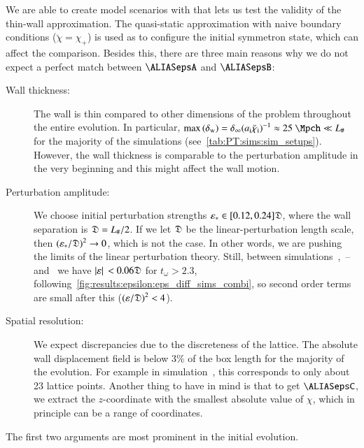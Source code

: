 





We are able to create model scenarios with \asgrd{} that lets us test the validity of the thin-wall approximation. The quasi-static approximation with naive boundary conditions ($\breve{\chi}=\chi_+$) is used as to configure the initial symmetron state, which can affect the comparison. %
Besides this, there are three main reasons why we do not expect a perfect match between $\epsA$ and $\epsB$:
\begin{description}
    \item[Wall thickness:] The wall is thin compared to other dimensions of the problem throughout the entire evolution. In particular, $\max{(\delta\ped{w})}=\delta_\infty  {(a\ped{i}\breve{\chi}\ped{i})}^{-1} \approx 25~\Mpch \ll L_\#$ for the majority of the simulations (see~\cref{tab:PT:sims:sim_setups}). However, the wall thickness is comparable to the perturbation amplitude in the very beginning and this might affect the wall motion.
    \item[Perturbation amplitude:] We choose initial perturbation strengths $\varepsilon_\ast\in[0.12, 0.24]\mathfrak{D}$, where the wall separation is $\mathfrak{D}=L_\#/2$. If we let $\mathfrak{D}$ be the linear-perturbation length scale, then ${(\varepsilon_\ast/\mathfrak{D})}^2 \to 0$, which is not the case. 
    In other words, we are pushing the limits of the linear perturbation theory. %
    Still, between simulations~,~-- and~ we have $\abs*{\varepsilon} < 0.06 \mathfrak{D}$ for $t_\omega>2.3$, following~\cref{fig:results:epsilon:eps_diff_sims_combi}, so second order terms are small after this (${(\varepsilon/\mathfrak{D})}^2< 4$\textperthousand).
    \item[Spatial resolution:] We expect discrepancies due to the discreteness of the lattice. The absolute wall displacement field is below 3\% of the box length for the majority of the evolution. For example in simulation~, this corresponds to only about 23 lattice points. 
    Another thing to have in mind is that to get $\epsC$, we extract the $z$-coordinate with the smallest absolute value of $\chi$, which in principle can be a range of coordinates.
\end{description}
The first two arguments are most prominent in the initial evolution. %






